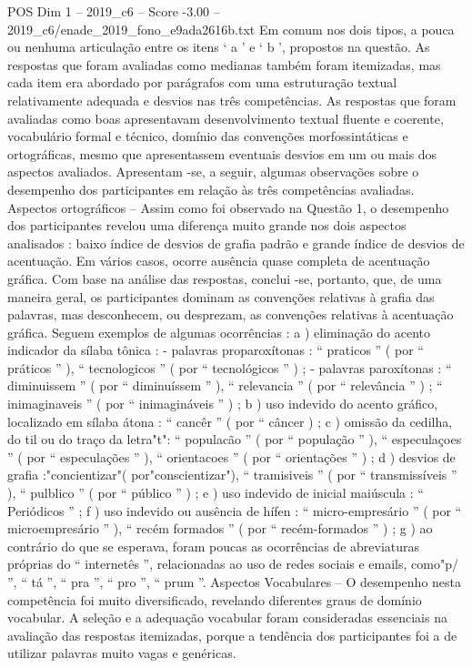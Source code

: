 \begin{textsample}{POS Dim 1 – 2019\_c6 – Score -3.00 – 2019\_c6/enade\_2019\_fono\_e9ada2616b.txt}
Em comum nos dois tipos, a pouca ou nenhuma articulação entre os itens ‘ a ’ e ‘ b ’, propostos na questão.
As respostas que foram avaliadas como medianas também foram itemizadas, mas cada item era abordado por parágrafos com uma estruturação textual relativamente adequada e desvios nas três competências.
As respostas que foram avaliadas como boas apresentavam desenvolvimento textual fluente e coerente, vocabulário formal e técnico, domínio das convenções morfossintáticas e ortográficas, mesmo que apresentassem eventuais desvios em um ou mais dos aspectos avaliados.
Apresentam -se, a seguir, algumas observações sobre o desempenho dos participantes em relação às três competências avaliadas.
Aspectos ortográficos – Assim como foi observado na Questão 1, o desempenho dos participantes revelou uma diferença muito grande nos dois aspectos analisados : baixo índice de desvios de grafia padrão e grande índice de desvios de acentuação.
Em vários casos, ocorre ausência quase completa de acentuação gráfica.
Com base na análise das respostas, conclui -se, portanto, que, de uma maneira geral, os participantes dominam as convenções relativas à grafia das palavras, mas desconhecem, ou desprezam, as convenções relativas à acentuação gráfica.
Seguem exemplos de algumas ocorrências : a ) eliminação do acento indicador da sílaba tônica : - palavras proparoxítonas : “ praticos ” ( por “ práticos ” ), “ tecnologicos ” ( por “ tecnológicos ” ) ; - palavras paroxítonas : “ diminuissem ” ( por “ diminuíssem ” ), “ relevancia ” ( por “ relevância ” ) ; “ inimaginaveis ” ( por “ inimagináveis ” ) ; b ) uso indevido do acento gráfico, localizado em sílaba átona : “ cancêr ” ( por “ câncer ) ; c ) omissão da cedilha, do til ou do traço da letra"t": “ populacão ” ( por “ população ” ), “ especulaçoes ” ( por “ especulações ” ), “ orientacoes ” ( por “ orientações ” ) ; d ) desvios de grafia :"concientizar"( por"conscientizar"), “ tramisiveis ” ( por “ transmissíveis ” ), “ pulblico ” ( por “ público ” ) ; e ) uso indevido de inicial maiúscula : “ Periódicos ” ; f ) uso indevido ou ausência de hífen : “ micro-empresário ” ( por “ microempresário ” ), “ recém formados ” ( por “ recém-formados ” ) ; g ) ao contrário do que se esperava, foram poucas as ocorrências de abreviaturas próprias do “ internetês ”, relacionadas ao uso de redes sociais e emails, como"p/ ”, “ tá ”, “ pra ”, “ pro ”, “ prum ”.
Aspectos Vocabulares – O desempenho nesta competência foi muito diversificado, revelando diferentes graus de domínio vocabular.
A seleção e a adequação vocabular foram consideradas essenciais na avaliação das respostas itemizadas, porque a tendência dos participantes foi a de utilizar palavras muito vagas e genéricas.

\end{textsample}
